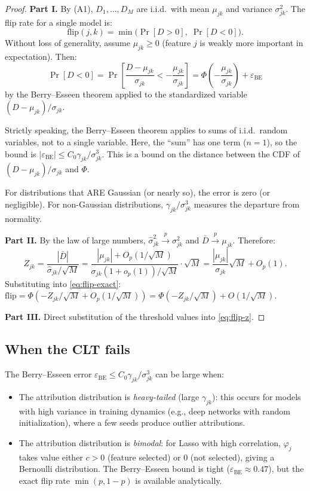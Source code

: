 \documentclass{article}
\begin{document}
\begin{proof}
\textbf{Part I.}
By (A1), $D_1, \ldots, D_M$ are i.i.d.\ with mean $\mu_{jk}$ and
variance $\sigma_{jk}^2$. The flip rate for a single model is:
\[
    \text{flip}(j,k) = \min\!\big(\Pr[D > 0],\; \Pr[D < 0]\big).
\]
Without loss of generality, assume $\mu_{jk} \geq 0$ (feature $j$ is
weakly more important in expectation). Then:
\[
    \Pr[D < 0] = \Pr\!\left[\frac{D - \mu_{jk}}{\sigma_{jk}} <
    -\frac{\mu_{jk}}{\sigma_{jk}}\right]
    = \Phi\!\left(-\frac{\mu_{jk}}{\sigma_{jk}}\right)
    + \varepsilon_{\text{BE}}
\]
by the Berry--Esseen theorem applied to the standardized variable
$(D - \mu_{jk})/\sigma_{jk}$.

Strictly speaking, the Berry--Esseen theorem applies to sums of
i.i.d.\ random variables, not to a single variable. Here, the
``sum'' has one term ($n=1$), so the bound is
$|\varepsilon_{\text{BE}}| \leq C_0 \gamma_{jk}/\sigma_{jk}^3$.
This is a bound on the distance between the CDF of
$(D-\mu_{jk})/\sigma_{jk}$ and $\Phi$.

For distributions that ARE Gaussian (or nearly so), the error is zero
(or negligible). For non-Gaussian distributions,
$\gamma_{jk}/\sigma_{jk}^3$ measures the departure from normality.

\textbf{Part II.}
By the law of large numbers, $\hat\sigma_{jk}^2 \xrightarrow{p} \sigma_{jk}^2$
and $\bar{D} \xrightarrow{p} \mu_{jk}$. Therefore:
\[
    Z_{jk} = \frac{|\bar{D}|}{\hat\sigma_{jk}/\sqrt{M}}
    = \frac{|\mu_{jk}| + O_p(1/\sqrt{M})}{\sigma_{jk}(1 + o_p(1))/\sqrt{M}}
    \cdot \sqrt{M}
    = \frac{|\mu_{jk}|}{\sigma_{jk}} \sqrt{M} + O_p(1).
\]
Substituting into \eqref{eq:flip-exact}:
$\text{flip} = \Phi(-Z_{jk}/\sqrt{M} + O_p(1/\sqrt{M}))
= \Phi(-Z_{jk}/\sqrt{M}) + O(1/\sqrt{M})$.

\textbf{Part III.}
Direct substitution of the threshold values into \eqref{eq:flip-z}.
\end{proof}

\subsection{When the CLT fails}

The Berry--Esseen error $\varepsilon_{\text{BE}} \leq
C_0 \gamma_{jk}/\sigma_{jk}^3$ can be large when:
\begin{itemize}
    \item The attribution distribution is \emph{heavy-tailed}
      (large $\gamma_{jk}$): this occurs for models with high
      variance in training dynamics (e.g., deep networks with
      random initialization), where a few seeds produce outlier
      attributions.
    \item The attribution distribution is \emph{bimodal}: for Lasso
      with high correlation, $\varphi_j$ takes value either $c > 0$
      (feature selected) or $0$ (not selected), giving a Bernoulli
      distribution. The Berry--Esseen bound is tight
      ($\varepsilon_{\text{BE}} \approx 0.47$), but the exact flip
      rate $\min(p, 1-p)$ is available analytically.
\end{itemize}
\end{document}
